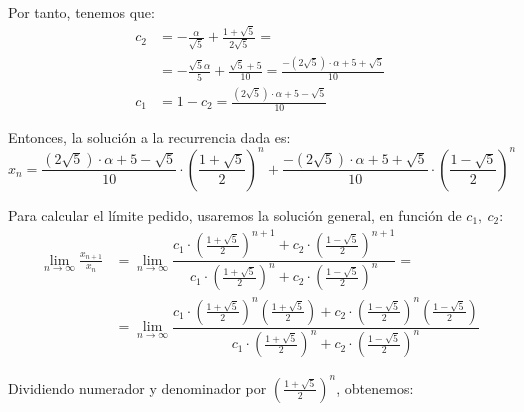 \begin{ejercicio}
    Por tanto, tenemos que:
    \begin{align*}
        c_2 &= -\frac{\alpha}{\sqrt{5}} + \frac{1+\sqrt{5}}{2\sqrt{5}}=\\
        &= -\frac{\sqrt{5}\alpha}{5} + \frac{\sqrt{5}+5}{10}
        = \frac{-(2\sqrt{5})\cdot \alpha + 5+\sqrt{5}}{10}\\
        c_1 &= 1-c_2 = \frac{(2\sqrt{5})\cdot \alpha +5-\sqrt{5}}{10}
    \end{align*}
    
    Entonces, la solución a la recurrencia dada es:
    \begin{equation*}
        x_n = \frac{(2\sqrt{5})\cdot \alpha +5-\sqrt{5}}{10}\cdot \left(\frac{1+\sqrt{5}}{2}\right)^n + \frac{-(2\sqrt{5})\cdot \alpha + 5+\sqrt{5}}{10}\cdot \left(\frac{1-\sqrt{5}}{2}\right)^n
    \end{equation*}

    Para calcular el límite pedido, usaremos la solución general, en función de $c_1,~c_2$:
    \begin{align*}
        \lim_{n\to \infty} \frac{x_{n+1}}{x_n}
        &= \lim_{n\to \infty} \dfrac{c_1\cdot \left(\frac{1+\sqrt{5}}{2}\right)^{n+1} + c_2\cdot \left(\frac{1-\sqrt{5}}{2}\right)^{n+1}}{c_1\cdot \left(\frac{1+\sqrt{5}}{2}\right)^n + c_2\cdot \left(\frac{1-\sqrt{5}}{2}\right)^n}
        =\\&= \lim_{n\to \infty} \dfrac{c_1\cdot \left(\frac{1+\sqrt{5}}{2}\right)^{n}\left(\frac{1+\sqrt{5}}{2}\right) + c_2\cdot \left(\frac{1-\sqrt{5}}{2}\right)^{n}\left(\frac{1-\sqrt{5}}{2}\right)}{c_1\cdot \left(\frac{1+\sqrt{5}}{2}\right)^n + c_2\cdot \left(\frac{1-\sqrt{5}}{2}\right)^n}
    \end{align*}

    Dividiendo numerador y denominador por $\left(\frac{1+\sqrt{5}}{2}\right)^n$, obtenemos:


\end{ejercicio}


